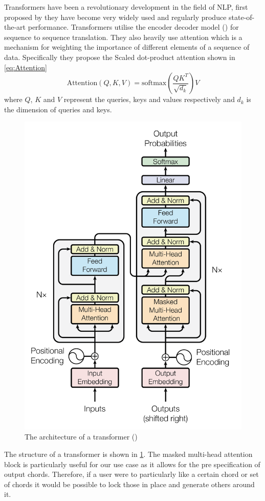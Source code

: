 Transformers have been a revolutionary development in the field of NLP, first proposed by \cite{Transformers} they have become very widely used and regularly produce state-of-the-art performance.
Transformers utilise the encoder decoder model (\cite{EncoderDecoder}) for sequence to sequence translation.
They also heavily use attention which is a mechanism for weighting the importance of different elements of a sequence of data.
Specifically they propose the Scaled dot-product attention shown in \cref{eq:Attention}
\begin{equation}
    \text{Attention}(Q,K,V) = \text{softmax}(\frac{QK^T}{\sqrt{d_k}})V
    \label{eq:Attention}
\end{equation}
where $Q$, $K$ and $V$ represent the queries, keys and values respectively and $d_k$ is the dimension of queries and keys.

\begin{figure}
    \centering
    \includegraphics[width=0.6\columnwidth]{Figures/Transformer}
    \decoRule
    \caption{The architecture of a transformer (\cite{Transformers})}
    \label{fig:Transformer}
\end{figure}

The structure of a transformer is shown in \cref{fig:Transformer}.
The masked multi-head attention block is particularly useful for our use case as it allows for the pre specification of output chords.
Therefore, if a user were to particularly like a certain chord or set of chords it would be possible to lock those in place and generate others around it.

